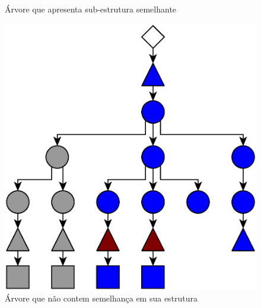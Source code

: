 \documentclass{beamer}
\newenvironment{my_itemize}{
\begin{itemize}
  \setlength{\itemsep}{5pt}
  \setlength{\parskip}{2pt}
  \setlength{\parsep}{3pt}
}{\end{itemize}}
\begin{document}
\begin{frame}[allowframebreaks]
\begin{my_itemize}
\begin{figure}[h]
    \caption{Árvore que apresenta sub-estrutura semelhante}
\end{figure}
\newpage
\begin{figure}[h]
    \includegraphics[scale=0.25]{img/tree3}
    \caption{Árvore que não contem semelhança em sua estrutura}
\end{figure}
  \end{my_itemize}
\end{frame}
\end{document}
